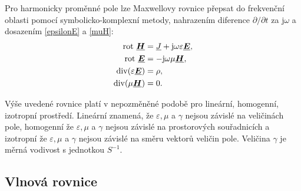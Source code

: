 \documentclass[12pt,a4paper,oneside]{article}
\numberwithin{equation}{section} %
\numberwithin{figure}{section} %
\numberwithin{table}{section} %
\newcommand{\mj}{\mathrm{j}} %
\renewcommand{\vec}[1]{\mbox{\boldmath$#1$}} %
\newcommand{\faz}[1]{{\underline{#1}}} %
\newcommand{\rot}{\mathrm{rot}\ }
\begin{document}
Pro harmonicky proměnné pole lze Maxwellovy rovnice přepsat do frekvenční oblasti pomocí symbolicko-komplexní metody, nahrazením diference $\partial / \partial t$ za $\mj \omega$ a dosazením \ref{epsilonE} a \ref{muH}:
\begin{subequations}
\begin{align}
\label{max1fharm}
\rot \faz{\vec{H}} &= \faz{J} + \mj \omega \varepsilon \faz{\vec{E}},
\\
\label{max2fharm}
\rot \faz{\vec{E}} &= - \mj \omega \mu \faz{\vec{H}},
\\
\udiv (\varepsilon \faz{\vec{E}}) &= \rho,
\\
\udiv (\mu \faz{\vec{H}}) &= 0.
\end{align}
\end{subequations}

Výše uvedené rovnice platí v nepozměněné podobě pro lineární, homogenní, izotropní prostředí. Lineární znamená, že $\varepsilon , \mu$ a $\gamma$ nejsou závislé na veličinách pole, homogenní že $\varepsilon , \mu$ a $\gamma$ nejsou závislé na prostorových souřadnicích a izotropní že $\varepsilon , \mu$ a $\gamma$ nejsou závislé na směru vektorů veličin pole. Veličina $\gamma$ je měrná vodivost s jednotkou $S ^{-1}$. \cite{Teorie}


\subsection{Vlnová rovnice}
\end{document}
